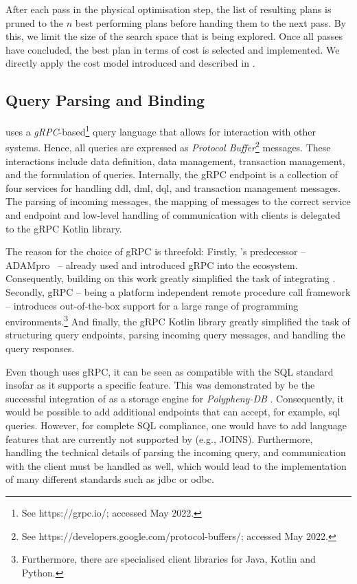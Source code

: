 After each pass in the physical optimisation step, the list of resulting plans is pruned to the $n$ best performing plans before handing them to the next pass. By this, we limit the size of the search space that is being explored. Once all passes have concluded, the best plan in terms of cost is selected and implemented. We directly apply the cost model introduced and described in .

\subsection{Query Parsing and Binding}
\cottontail{} uses a \emph{gRPC}-based\footnote{See https://grpc.io/; accessed May 2022.} query language that allows for interaction with other systems. Hence, all queries are expressed as \emph{Protocol Buffer}\footnote{See https://developers.google.com/protocol-buffers/; accessed May 2022.} messages. These interactions include data definition, data management, transaction management, and the formulation of queries. Internally, the gRPC endpoint is a collection of four services for handling \acrshort{ddl}, \acrshort{dml}, \acrshort{dql}, and transaction management messages. The parsing of incoming messages, the mapping of messages to the correct service and endpoint and low-level handling of communication with clients is delegated to the gRPC Kotlin library. 

The reason for the choice of gRPC is threefold: Firstly, \cottontail{}'s predecessor -- ADAMpro~\cite{Giangreco:2016Adam} -- already used and introduced gRPC into the\vitrivr{} ecosystem. Consequently, building on this work greatly simplified the task of integrating \cottontail{}. Secondly, gRPC -- being a platform independent remote procedure call framework -- introduces out-of-the-box support for a large range of programming environments.\footnote{Furthermore, there are specialised client libraries for Java, Kotlin and Python.} And finally, the gRPC Kotlin library greatly simplified the task of structuring query endpoints, parsing incoming query messages, and handling the query responses.

Even though \cottontail{} uses gRPC, it can be seen as compatible with the SQL standard insofar as it supports a specific feature. This was demonstrated by be the successful integration of \cottontail{} as a storage engine for \emph{Polypheny-DB} \cite{Vogt:2018Polypheny,Vogt:2020Polypheny}. Consequently, it would be possible to add additional endpoints that can accept, for example, \acrshort{sql} queries. However, for complete SQL compliance, one would have to add language features that are currently not supported by \cottontail{} (e.g., JOINS). Furthermore, handling the technical details of parsing the incoming query, and communication with the client must be handled as well, which would lead to the implementation of many different standards such as \acrshort{jdbc} or \acrshort{odbc}.

